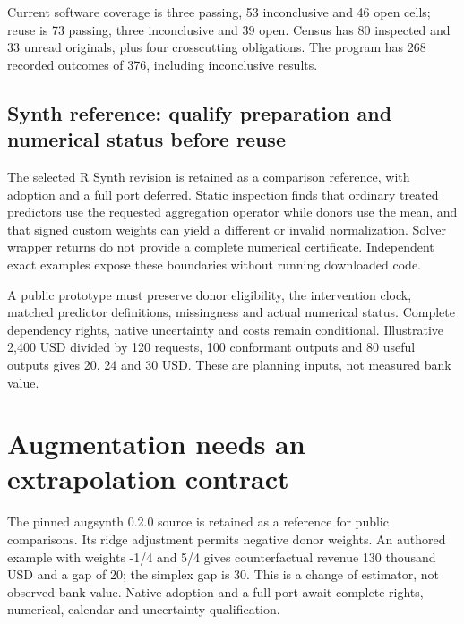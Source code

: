 Current software coverage is three passing, 53 inconclusive and 46 open
cells; reuse is 73 passing, three inconclusive and 39 open. Census has
80 inspected and 33 unread originals, plus four crosscutting
obligations. The program has 268 recorded outcomes of 376, including
inconclusive results.
\citep{sp24synth_reader,sp24synth_progress,sp24augsynth_reader,sp24augsynth_progress,sp24scpi_reader,sp24scpi_progress,sp24lmpanel_reader,sp24lmpanel_progress,sp24ananke_reader,sp24ananke_progress,sp24lingam_reader,sp24lingam_progress}

\hypertarget{synth-reference-qualify-preparation-and-numerical-status-before-reuse}{%
\subsection{Synth reference: qualify preparation and numerical status
before
reuse}\label{synth-reference-qualify-preparation-and-numerical-status-before-reuse}}

The selected R Synth revision is retained as a comparison reference,
with adoption and a full port deferred. Static inspection finds that
ordinary treated predictors use the requested aggregation operator while
donors use the mean, and that signed custom weights can yield a
different or invalid normalization. Solver wrapper returns do not
provide a complete numerical certificate. Independent exact examples
expose these boundaries without running downloaded code.
\citep{exec24_synth_source,exec24_synth_choice}

A public prototype must preserve donor eligibility, the intervention
clock, matched predictor definitions, missingness and actual numerical
status. Complete dependency rights, native uncertainty and costs remain
conditional. Illustrative 2,400 USD divided by 120 requests, 100
conformant outputs and 80 useful outputs gives 20, 24 and 30 USD. These
are planning inputs, not measured bank value.
\citep{exec24_synth_choice}

\hypertarget{augmentation-needs-an-extrapolation-contract}{%
\section{Augmentation needs an extrapolation
contract}\label{augmentation-needs-an-extrapolation-contract}}

The pinned augsynth 0.2.0 source is retained as a reference for public
comparisons. Its ridge adjustment permits negative donor weights. An
authored example with weights -1/4 and 5/4 gives counterfactual revenue
130 thousand USD and a gap of 20; the simplex gap is 30. This is a
change of estimator, not observed bank value. Native adoption and a full
port await complete rights, numerical, calendar and uncertainty
qualification. \citep{exec24_augsynth_source,exec24_augsynth_choice}

